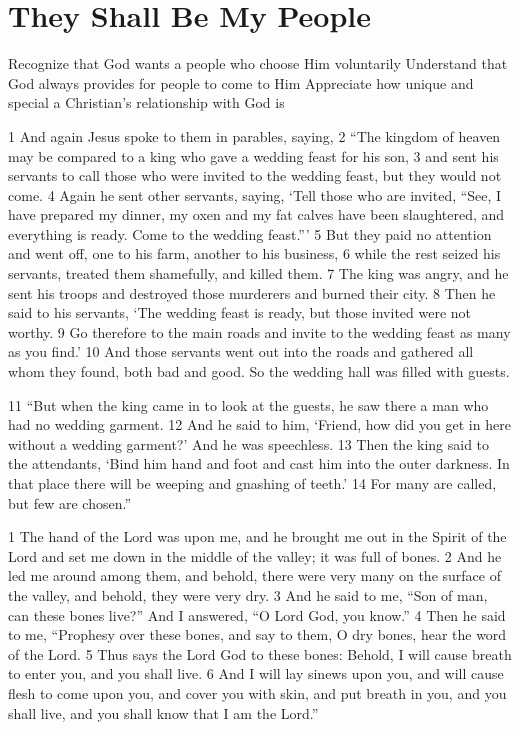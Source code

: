 \chapter{They Shall Be My People}

\begin{goals}
\goal Recognize that God wants a people who choose Him voluntarily
\goal Understand that God always provides for people to come to Him
\goal Appreciate how unique and special a Christian's relationship with God is
\end{goals}

\begin{bible}


1 And again Jesus spoke to them in parables, saying, 2 ``The kingdom of heaven may be compared to a king who gave a wedding feast for his son, 3 and sent his servants to call those who were invited to the wedding feast, but they would not come. 4 Again he sent other servants, saying, `Tell those who are invited, ``See, I have prepared my dinner, my oxen and my fat calves have been slaughtered, and everything is ready. Come to the wedding feast.''\thinspace' 5 But they paid no attention and went off, one to his farm, another to his business, 6 while the rest seized his servants, treated them shamefully, and killed them. 7 The king was angry, and he sent his troops and destroyed those murderers and burned their city. 8 Then he said to his servants, `The wedding feast is ready, but those invited were not worthy. 9 Go therefore to the main roads and invite to the wedding feast as many as you find.' 10 And those servants went out into the roads and gathered all whom they found, both bad and good. So the wedding hall was filled with guests.

11 ``But when the king came in to look at the guests, he saw there a man who had no wedding garment. 12 And he said to him, `Friend, how did you get in here without a wedding garment?' And he was speechless. 13 Then the king said to the attendants, `Bind him hand and foot and cast him into the outer darkness. In that place there will be weeping and gnashing of teeth.' 14 For many are called, but few are chosen.''


1 The hand of the Lord was upon me, and he brought me out in the Spirit of the Lord and set me down in the middle of the valley; it was full of bones. 2 And he led me around among them, and behold, there were very many on the surface of the valley, and behold, they were very dry. 3 And he said to me, ``Son of man, can these bones live?'' And I answered, ``O Lord God, you know.'' 4 Then he said to me, ``Prophesy over these bones, and say to them, O dry bones, hear the word of the Lord. 5 Thus says the Lord God to these bones: Behold, I will cause breath to enter you, and you shall live. 6 And I will lay sinews upon you, and will cause flesh to come upon you, and cover you with skin, and put breath in you, and you shall live, and you shall know that I am the Lord.''


\end{bible}
